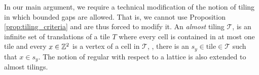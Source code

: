 \documentclass[12pt]{amsart}
\begin{document}
In our main argument, we require a technical modification of the notion of tiling in which bounded gaps are allowed. That is, 
we cannot use Proposition \ref{prop:tiling_criteria} and are thus forced to modify it.
An {\it almost} tiling $\mathcal{T}$, is an infinite set of translations of a tile $T$ where every cell is contained 
in at most one tile and every $x \in \mathbb{Z}^2$ is a vertex of a cell in $\mathcal{T}$, \ie,  there is an $s_y \in \text{tile} \in \mathcal{T}$ such that $x \in s_y$. The notion of regular with respect to a lattice is also extended to almost tilings. 

\end{document}
